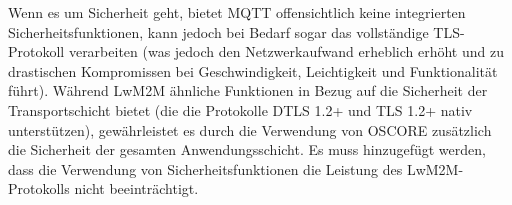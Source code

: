 Wenn es um Sicherheit geht, bietet MQTT offensichtlich keine integrierten Sicherheitsfunktionen, kann jedoch bei Bedarf sogar das vollständige TLS-Protokoll verarbeiten (was jedoch den Netzwerkaufwand erheblich erhöht und zu drastischen Kompromissen bei Geschwindigkeit, Leichtigkeit und Funktionalität führt). Während LwM2M ähnliche Funktionen in Bezug auf die Sicherheit der Transportschicht bietet (die die Protokolle DTLS 1.2+ und TLS 1.2+ nativ unterstützen), gewährleistet es durch die Verwendung von OSCORE zusätzlich die Sicherheit der gesamten Anwendungsschicht. Es muss hinzugefügt werden, dass die Verwendung von Sicherheitsfunktionen die Leistung des LwM2M-Protokolls nicht beeinträchtigt.

